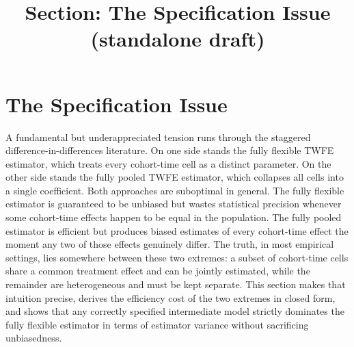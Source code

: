 \documentclass[12pt]{article}
\title{Section: The Specification Issue (standalone draft)}
\author{}
\date{}
\newcommand{\1}{\mathbbm{1}}
\begin{document}
\maketitle

\section{The Specification Issue}
\label{sec:spec_issue}

A fundamental but underappreciated tension runs through the staggered
difference-in-differences literature.
On one side stands the fully flexible TWFE estimator, which treats
every cohort-time cell as a distinct parameter.
On the other side stands the fully pooled TWFE estimator, which collapses
all cells into a single coefficient.
Both approaches are suboptimal in general.
The fully flexible estimator is guaranteed to be unbiased but wastes
statistical precision whenever some cohort-time effects happen to be
equal in the population.
The fully pooled estimator is efficient but produces biased estimates of
every cohort-time effect the moment any two of those effects genuinely
differ.
The truth, in most empirical settings, lies somewhere between these two
extremes: a subset of cohort-time cells share a common treatment effect
and can be jointly estimated, while the remainder are heterogeneous and
must be kept separate.
This section makes that intuition precise, derives the efficiency cost
of the two extremes in closed form, and shows that any correctly specified
intermediate model strictly dominates the fully flexible estimator in terms
of estimator variance without sacrificing unbiasedness.

\bigskip
\end{document}
